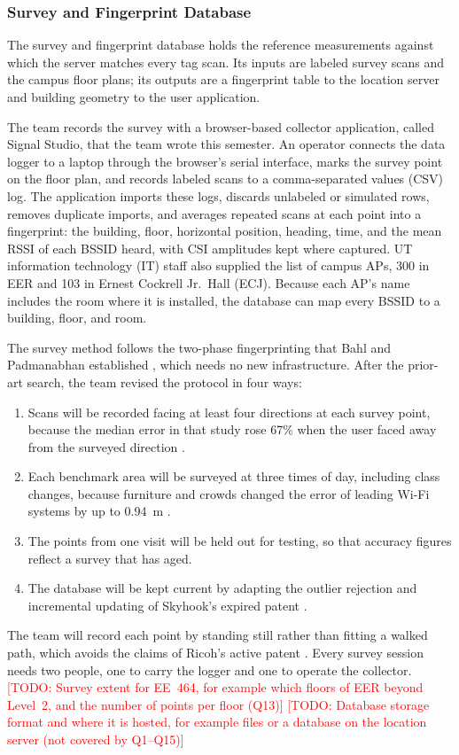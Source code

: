 \documentclass[12pt,letterpaper]{article}
\newcommand{\TODO}[1]{\textcolor{red}{[TODO: #1]}}
\begin{document}
\subsubsection{Survey and Fingerprint Database}
The survey and fingerprint database holds the reference measurements against which the server matches
every tag scan. Its inputs are labeled survey scans and the campus floor plans; its outputs are a
fingerprint table to the location server and building geometry to the user application.

The team records the survey with a browser-based collector application, called Signal Studio, that
the team wrote this semester. An operator connects the data logger to a laptop through the browser's
serial interface, marks the survey point on the floor plan, and records labeled scans to a
comma-separated values (CSV) log. The application imports these logs, discards unlabeled or simulated
rows, removes duplicate imports, and averages repeated scans at each point into a fingerprint: the
building, floor, horizontal position, heading, time, and the mean RSSI of each BSSID heard, with CSI
amplitudes kept where captured. UT information technology (IT) staff also supplied the list of campus
APs, 300 in EER and 103 in Ernest Cockrell Jr.\ Hall (ECJ). Because each AP's name includes the room
where it is installed, the database can map every BSSID to a building, floor, and room.

The survey method follows the two-phase fingerprinting that Bahl and Padmanabhan established
\cite{radar}, which needs no new infrastructure. After the prior-art search, the team revised the
protocol in four ways:
\begin{enumerate}
  \item Scans will be recorded facing at least four directions at each survey point, because the
    median error in that study rose 67\% when the user faced away from the surveyed direction
    \cite{radar}.
  \item Each benchmark area will be surveyed at three times of day, including class changes,
    because furniture and crowds changed the error of leading Wi-Fi systems by up to 0.94~m
    \cite{msilc}.
  \item The points from one visit will be held out for testing, so that accuracy figures reflect a
    survey that has aged.
  \item The database will be kept current by adapting the outlier rejection and incremental updating
    of Skyhook's expired patent \cite{skyhook}.
\end{enumerate}
The team will record each point by standing still rather than fitting a walked path, which avoids
the claims of Ricoh's active patent \cite{ricoh}. Every survey session needs two people, one to
carry the logger and one to operate the collector. \TODO{Survey extent for EE~464, for example which
floors of EER beyond Level~2, and the number of points per floor (Q13)} \TODO{Database storage
format and where it is hosted, for example files or a database on the location server (not covered
by Q1--Q15)}
\end{document}
